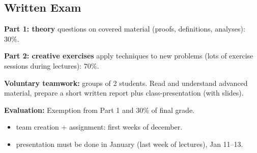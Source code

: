 \subsection{Written Exam}
\textbf{Part 1: theory} questions on covered material (proofs, definitions, analyses): $30\%$.

\textbf{Part 2: creative exercises} apply techniques to new problems (lots of exercise sessions during lectures): $70\%$.

\textbf{Voluntary teamwork:} groups of 2 students. Read and understand advanced material, prepare a short written report plus class-presentation (with slides).

\textbf{Evaluation:} Exemption from Part 1 and $30\%$ of final grade.

\begin{itemize}
\item team creation + assignment: first weeks of december.
\item presentation must be done in January (last week of lectures), Jan 11--13.
\end{itemize}
